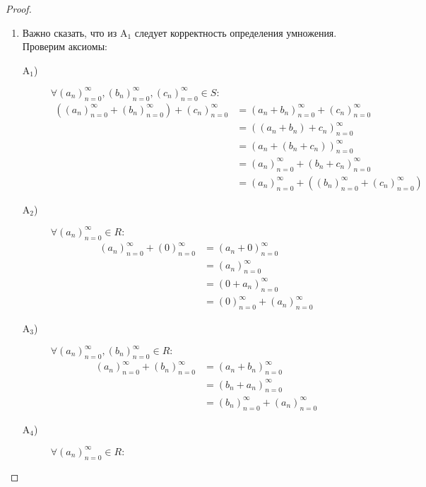 \documentclass[12pt,a4paper]{article}
\newcommand{\A}{\ensuremath{\mathrm{A}}\xspace}
\begin{document}
    \begin{proof}
        \begin{enumerate}
            \item Важно сказать, что из $\A_1$ следует корректность определения умножения. Проверим аксиомы:
                \begin{description}
                    \item[$\A_1$)] $\forall (a_n)_{n=0}^\infty, (b_n)_{n=0}^\infty, (c_n)_{n=0}^\infty \in S:$
                        \begin{align*}
                            ((a_n)_{n=0}^\infty + (b_n)_{n=0}^\infty) + (c_n)_{n=0}^\infty
                            &= (a_n + b_n)_{n=0}^\infty + (c_n)_{n=0}^\infty\\
                            &= ((a_n + b_n) + c_n)_{n=0}^\infty\\
                            &= (a_n + (b_n + c_n))_{n=0}^\infty\\
                            &= (a_n)_{n=0}^\infty + (b_n + c_n)_{n=0}^\infty\\
                            &= (a_n)_{n=0}^\infty + ((b_n)_{n=0}^\infty + (c_n)_{n=0}^\infty)
                        \end{align*}
                    \item[$\A_2$)] $\forall (a_n)_{n=0}^\infty \in R:$
                        \begin{align*}
                            (a_n)_{n=0}^\infty + (0)_{n=0}^\infty
                            &= (a_n + 0)_{n=0}^\infty\\
                            &= (a_n)_{n=0}^\infty\\
                            &= (0 + a_n)_{n=0}^\infty\\
                            &= (0)_{n=0}^\infty + (a_n)_{n=0}^\infty
                        \end{align*}
                    \item[$\A_3$)] $\forall (a_n)_{n=0}^\infty, (b_n)_{n=0}^\infty \in R:$
                        \begin{align*}
                            (a_n)_{n=0}^\infty + (b_n)_{n=0}^\infty
                            &= (a_n + b_n)_{n=0}^\infty\\
                            &= (b_n + a_n)_{n=0}^\infty\\
                            &= (b_n)_{n=0}^\infty + (a_n)_{n=0}^\infty
                        \end{align*}
                    \item[$\A_4$)] $\forall (a_n)_{n=0}^\infty \in R:$

\end{description}
\end{enumerate}
\end{proof}
\end{document}

